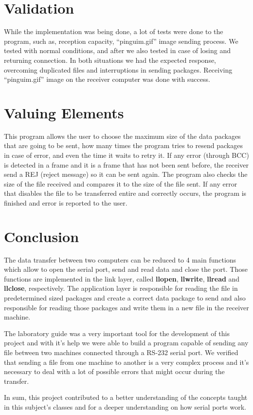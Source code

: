 \documentclass[a4paper]{article}
\begin{document}
\section{Validation}

While the implementation was being done, a lot of tests were done to the program, such as, reception capacity, “pinguim.gif” image sending process. We tested with normal conditions, and after we also tested in case of losing and returning connection. In both situations we had the expected response, overcoming duplicated files and
interruptions in sending packages. Receiving “pinguim.gif” image on the receiver computer was done with success.

\section{Valuing Elements}

This program allows the user to choose the maximum size of the data packages that are going to be sent, how many times the program tries to resend packages in case of error, and even the time it waits to retry it. If any error (through BCC) is detected in a frame and it is a frame that has not been sent before, the receiver send a REJ (reject message) so it can be sent again. The program also checks the size of the file received and compares it to the size of the file sent. If any error that disables the file to be transferred entire and correctly occurs, the program is finished and error is reported to the user.

\section{Conclusion}
The data transfer between two computers can be reduced to 4 main functions which allow to open the serial port, send and read data and close the port. Those functions are implemented in the link layer, called \textbf{llopen}, \textbf{llwrite}, \textbf{llread} and \textbf{llclose}, respectively. The application layer is responsible for reading the file in predetermined sized packages and create a correct data package to send and also responsible for reading those packages and write them in a new file in the receiver machine.

The laboratory guide was a very important tool for the development of this project and with it's help we were able to build a program capable of sending any file between two machines connected through a RS-232 serial port. We verified that sending a file from one machine to another is a very complex process and it's necessary to deal with a lot of possible errors that might occur during the transfer. 

In sum, this project contributed to a better understanding of the concepts taught in this subject's classes and for a deeper understanding on how serial ports work.
\end{document}
